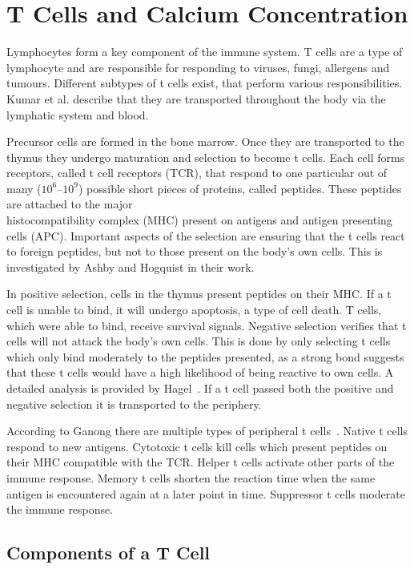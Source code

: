 \chapter{T Cells and Calcium Concentration}
\label{chapter:t-cell}

Lymphocytes form a key component of the immune system. T cells are a type of lymphocyte and are responsible for responding to viruses, fungi, allergens and tumours. Different subtypes of t cells exist, that perform various responsibilities. Kumar et al. describe that they are transported throughout the body via the lymphatic system and blood.\cite{Kumar2018}

Precursor cells are formed in the bone marrow. Once they are transported to the thymus they undergo maturation and selection to become t cells. Each cell forms receptors, called t cell receptors (TCR), that respond to one particular out of many ($10^6 – 10^9$) possible short pieces of proteins, called peptides. These peptides are attached to the major\\ histocompatibility complex (MHC) present on antigens and antigen presenting cells (APC). Important aspects of the selection are ensuring that the t cells react to foreign peptides, but not to those present on the body's own cells. This is investigated by Ashby and Hogquist in their work\cite{Ashby2024}.

In positive selection, cells in the thymus present peptides on their MHC. If a t cell is unable to bind, it will undergo apoptosis, a type of cell death. T cells, which were able to bind, receive survival signals. Negative selection verifies that t cells will not attack the body's own cells. This is done by only selecting t cells which only bind moderately to the peptides presented, as a strong bond suggests that these t cells would have a high likelihood of being reactive to own cells. A detailed analysis is provided by Hagel~\cite{Hagel2018}. If a t cell passed both the positive and negative selection it is transported to the periphery.

According to Ganong there are multiple types of peripheral t cells~\cite{Ganong1997}. Native t cells respond to new antigens. Cytotoxic t cells kill cells which present peptides on their MHC compatible with the TCR. Helper t cells activate other parts of the immune response. Memory t cells shorten the reaction time when the same antigen is encountered again at a later point in time. Suppressor t cells moderate the immune response.

\section{Components of a T Cell}

